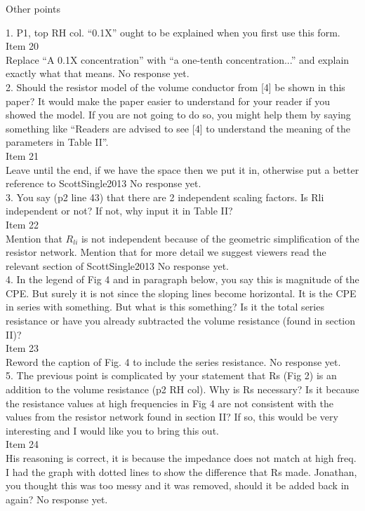 \documentclass[journal, a4paper]{IEEEtran}
\begin{document}
{Other points

1. P1, top RH col. ``0.1X'' ought to be explained when you first use this form.\\
{\color{OliveGreen}
    Item 20\\
    {\color{Red} Replace ``A 0.1X concentration'' with ``a one-tenth concentration...'' and explain exactly what that means.}
    No response yet.
}\\

2. Should the resistor model of the volume conductor from [4] be shown in this paper? It would make the paper easier to understand for your reader if you showed the model. If you are not going to do so, you might help them by saying something like ``Readers are advised to see [4] to understand the meaning of the parameters in Table II''.\\
{\color{OliveGreen}
    Item 21\\
    {\color{Red} Leave until the end, if we have the space then we put it in, otherwise put a better reference to ScottSingle2013}
    No response yet.
}\\

3. You say (p2 line 43) that there are 2 independent scaling factors. Is Rli independent or not? If not, why input it in Table II?\\
{\color{OliveGreen}
    Item 22\\
    {\color{Red} Mention that $R_{li}$ is not independent because of the geometric simplification of the resistor network. Mention that for more detail we suggest viewers read the relevant section of ScottSingle2013}
    No response yet.
}\\

4. In the legend of Fig 4 and in paragraph below, you say this is magnitude of the CPE. But surely it is not since the sloping lines become horizontal. It is the CPE in series with something. But what is this something? Is it the total series resistance or have you already subtracted the volume resistance (found in section II)?\\
{\color{OliveGreen}
    Item 23\\
    {\color{Red} Reword the caption of Fig. 4 to include the series resistance.}
    No response yet.
}\\

5. The previous point is complicated by your statement that Rs (Fig 2) is an addition to the volume resistance (p2 RH col). Why is Rs necessary? Is it because the resistance values at high frequencies in Fig 4 are not consistent with the values from the resistor network found in section II? If so, this would be very interesting and I would like you to bring this out.\\
{\color{OliveGreen} 
    Item 24\\
    {\color{Red} His reasoning is correct, it is because the impedance does not match at high freq. I had the graph with dotted lines to show the difference that Rs made. Jonathan, you thought this was too messy and it was removed, should it be added back in again?}
    No response yet.
}\\

}
\end{document}
